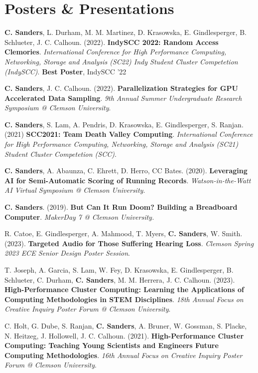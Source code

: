 \section{\textbf{Posters \& Presentations}}
\vspace{-0.4mm}
\small{
\resumeSubHeadingListStart

\item \textbf{C. Sanders}, L. Durham, M. M. Martinez, D. Krasowska, E. Gindlesperger, B. Schlueter, J. C. Calhoun. (2022). \textbf{IndySCC 2022: Random Access Clemories}. \emph{International Conference for High Performance Computing, Networking, Storage and Analysis (SC22) Indy Student Cluster Competetion (IndySCC)}. \textbf{Best Poster}, IndySCC '22

\item \textbf{C. Sanders}, J. C. Calhoun. (2022). \textbf{Parallelization Strategies for GPU Accelerated Data Sampling}. \emph{9th Annual Summer Undergraduate Research Symposium @ Clemson University}.

\item \textbf{C. Sanders}, S. Lam, A. Pendris, D. Krasowska, E. Gindlesperger, S. Ranjan. (2021) \textbf{SCC2021: Team Death Valley Computing}. \emph{International Conference for High Performance Computing, Networking, Storage and Analysis (SC21) Student Cluster Competetion (SCC)}.


\item \textbf{C. Sanders}, A. Abaunza, C. Ehrett, D. Herro, CC Bates. (2020). \textbf{Leveraging AI for Semi-Automatic Scoring of Running Records}. \emph{Watson-in-the-Watt AI Virtual Symposium @ Clemson University}.

\item \textbf{C. Sanders}. (2019). \textbf{But Can It Run Doom? Building a Breadboard Computer}. \emph{MakerDay 7 @ Clemson University.}

\item R. Catoe, E. Gindlesperger, A. Mahmood, T. Myers, \textbf{C. Sanders}, W. Smith. (2023). \textbf{Targeted Audio for Those Suffering Hearing Loss}. \emph{Clemson Spring 2023 ECE Senior Design Poster Session}.

\item T. Joseph, A. Garcia, S. Lam, W. Fey, D. Krasowska, E. Gindlesperger, B. Schlueter, C. Durham, \textbf{C. Sanders}, M. M. Herrera, J. C. Calhoun. (2023). \textbf{High-Performance Cluster Computing: Learning the Applications of Computing Methodologies in STEM Disciplines}. \emph{18th Annual Focus on Creative Inquiry Poster Forum @ Clemson University}.

\item C. Holt, G. Dube, S. Ranjan, \textbf{C. Sanders}, A. Bruner, W. Gossman, S. Placke, N. Heitzeg, J. Hollowell, J. C. Calhoun. (2021). \textbf{High-Performance Cluster Computing: Teaching Young Scientists and Engineers Future Computing Methodologies}. \emph{16th Annual Focus on Creative Inquiry Poster Forum @ Clemson University}.

\resumeSubHeadingListEnd
}
\vspace{-6mm}

